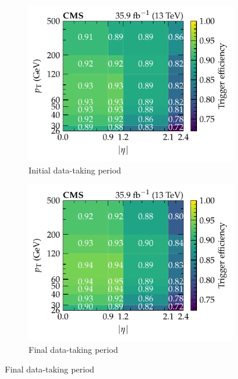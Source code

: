 \begin{figure}[htbp]
    \centering
    \begin{subfigure}[b]{0.49\textwidth}
        \centering
        \includegraphics{chapters/041_corrections/images/efficiencies/triggers/muons/muon_RunBCDEF_trigger_efficiency.pdf}
        \caption{Initial data-taking period}
        \label{subfiga:muon-trigger-efficiency}
    \end{subfigure}
    \hfill
    \begin{subfigure}[b]{0.49\textwidth}
        \centering
        \includegraphics{chapters/041_corrections/images/efficiencies/triggers/muons/muon_RunGH_trigger_efficiency.pdf}
        \caption{Final data-taking period}
        \label{subfigb:muon-trigger-efficiency}

\end{subfigure}
\end{figure}
